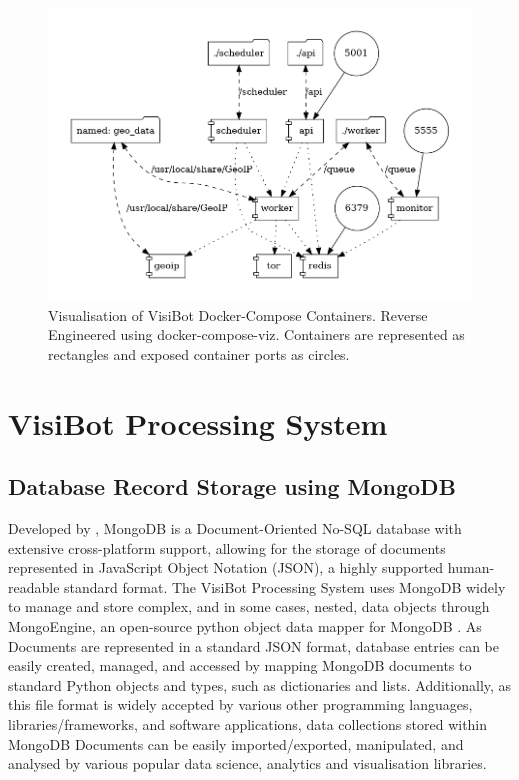 \begin{figure}[!htb]
    \centering
    \includegraphics[width=0.75\linewidth]{graphs/docker-compose.png}
    \caption{Visualisation of VisiBot Docker-Compose Containers. Reverse Engineered using docker-compose-viz. Containers are represented as rectangles and exposed container ports as circles.}
    \label{fig:docker_graph} 
\end{figure}





\section{VisiBot Processing System}

\subsection{Database Record Storage using MongoDB}

Developed by \citet{MongoDB}, MongoDB is a Document-Oriented No-SQL database with extensive cross-platform support, allowing for the storage of documents represented in JavaScript Object Notation (JSON), a highly supported human-readable standard format. The VisiBot Processing System uses MongoDB widely to manage and store complex, and in some cases, nested, data objects through MongoEngine, an open-source python object data mapper for MongoDB \citep{MongoEngine}. As Documents are represented in a standard JSON format, database entries can be easily created, managed, and accessed by mapping MongoDB documents to standard Python objects and types, such as dictionaries and lists. Additionally, as this file format is widely accepted by various other programming languages, libraries/frameworks, and software applications, data collections stored within MongoDB Documents can be easily imported/exported, manipulated, and analysed by various popular data science, analytics and visualisation libraries.

